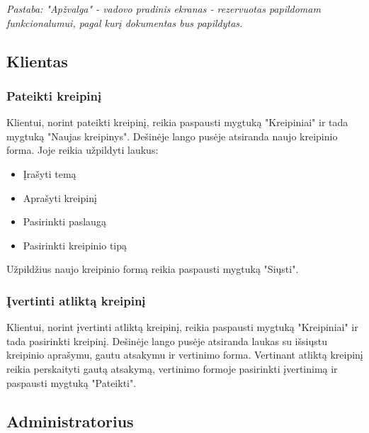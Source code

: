 	\textit{Pastaba: "Apžvalga" - vadovo pradinis ekranas - rezervuotas papildomam funkcionalumui, pagal kurį dokumentas bus papildytas.}
	
\subsection{Klientas}

	\subsubsection{Pateikti kreipinį}
	
	
	Klientui, norint pateikti kreipinį, reikia paspausti mygtuką "Kreipiniai" ir tada mygtuką "Naujas kreipinys".
	Dešinėje lango pusėje atsiranda naujo kreipinio forma. Joje reikia užpildyti laukus:
	
	\begin{itemize}
		\item Įrašyti temą
		\item Aprašyti kreipinį
		\item Pasirinkti paslaugą
		\item Pasirinkti kreipinio tipą
	\end{itemize}
	
	Užpildžius naujo kreipinio formą reikia paspausti mygtuką "Siųsti".

	\subsubsection{Įvertinti atliktą kreipinį}
	
	
	Klientui, norint įvertinti atliktą kreipinį, reikia paspausti mygtuką "Kreipiniai" ir tada pasirinkti kreipinį.
	Dešinėje lango pusėje atsiranda laukas su išsiųstu kreipinio aprašymu, gautu atsakymu ir vertinimo forma.
	Vertinant atliktą kreipinį reikia perskaityti gautą atsakymą, vertinimo formoje pasirinkti įvertinimą ir paspausti mygtuką "Pateikti".
	
\subsection{Administratorius}


